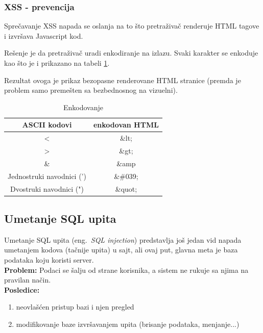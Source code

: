 \documentclass[a4paper]{article}
\begin{document}
\subsubsection{XSS - prevencija}

Sprečavanje XSS \cite{XSS_prev} napada se oslanja na to što pretraživač renderuje HTML tagove i izvršava Javascript kod.  

Rešenje je da pretraživač uradi enkodiranje na izlazu. Svaki karakter se enkoduje kao što je i prikazano na tabeli \ref{kodiranje}.

Rezultat ovoga je prikaz bezopasne renderovane HTML stranice (premda je problem samo premešten sa bezbednosnog na vizuelni).


\begin{table}[ht]

\begin{center}
\caption{Enkodovanje}
\begin{tabular}{ | c | c | }
\hline
	\rowcolor{yellow}
\textbf{ASCII kodovi} & \textbf{enkodovan HTML} \\
	\hline
 < & \&lt; \\ 
 \hline
 > & \&gt; \\  
 \hline
 \& & \&amp \\
 \hline
 Jednostruki navodnici (') & \&\#039;\\
 \hline
 Dvostruki navodnici (") & \&quot;\\  
 \hline  
\end{tabular}

\label{kodiranje}
\end{center}
\end{table}

\subsection{Umetanje SQL upita}

Umetanje SQL upita (eng.~{\em SQL injection}) \cite{SQL} predstavlja još jedan vid napada umetanjem kodova (tačnije upita) u sajt, ali ovaj put, glavna meta je baza podataka koju koristi server.\\
\textbf{Problem:} Podaci se šalju od strane korisnika, a sistem ne rukuje sa njima na pravilan način.\\
\textbf{Posledice:} 
\begin{enumerate}
	\item neovlašćen pristup bazi i njen pregled
	\item modifikovanje baze izvršavanjem upita (brisanje podataka, menjanje...)
\end{enumerate}
\end{document}
